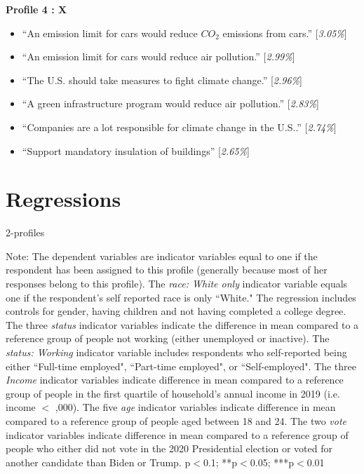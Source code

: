 \documentclass{article}
\begin{document}
\textbf{Profile 4 : X}
\begin{itemize}
\item ``An emission limit for cars would reduce $CO_2$ emissions from cars.'' [\textit{3.05\%}]
\item ``An emission limit for cars would reduce air pollution.'' [\textit{2.99\%}]
\item ``The U.S. should take measures to fight climate change.'' [\textit{2.96\%}]
\item ``A green infrastructure program would reduce air pollution.'' [\textit{2.83\%}]
\item ``Companies are a lot responsible for climate change in the U.S..'' [\textit{2.74\%}]
\item ``Support mandatory insulation of buildings'' [\textit{2.65\%}]

\end{itemize}

\section{Regressions}
\begin{table}[h!]
    \caption{2-profiles}
    \begin{center}
        \scalebox{0.7}{}
    \end{center}
    {\footnotesize Note: The dependent variables are indicator variables equal to one if the respondent has been assigned to this profile (generally because most of her responses belong to this profile). 
    The \textit{race: White only} indicator variable equals one if the respondent's self reported race is only ``White." The regression includes controls for gender, having children and not having completed a college degree. The three \textit{status} indicator variables indicate the difference in mean compared to a reference group of people not working (either unemployed or inactive). The \textit{status: Working} indicator variable includes respondents who self-reported being either ``Full-time employed", ``Part-time employed", or ``Self-employed". The three \textit{Income} indicator variables indicate difference in mean compared to a reference group of people in the first quartile of household's annual income in 2019 (i.e. income $<$ ,000). The five \textit{age} indicator variables indicate difference in mean compared to a reference group of people aged between 18 and 24. The two \textit{vote} indicator variables indicate difference in mean compared to a reference group of people who either did not vote in the 2020 Presidential election or voted for another candidate than Biden or Trump.
    \newline  *p$<$0.1; **p$<$0.05; ***p$<$0.01}
\end{table} 
\end{document}
